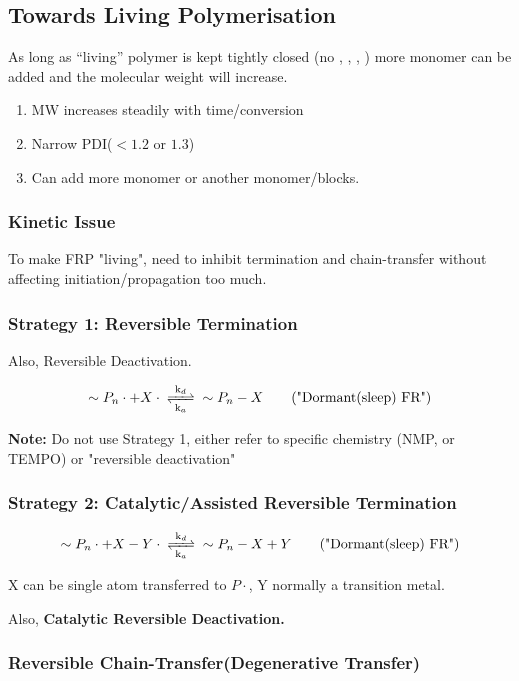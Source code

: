 \documentclass{NoteThesis/note-thesis}
\begin{document}
\subsection{Towards Living Polymerisation}

As long as “living” polymer is kept tightly closed (no , , , ) more monomer can be added and the molecular weight will increase.

\begin{enumerate}
    \item MW increases steadily with time/conversion
    \item Narrow PDI($<1.2$ or $1.3$)
    \item Can add more monomer or another monomer/blocks.
\end{enumerate}

\subsubsection*{Kinetic Issue}

To make FRP "living", need to inhibit termination and chain-transfer without affecting initiation/propagation too much.

\subsubsection*{Strategy 1: Reversible Termination}

Also, Reversible Deactivation.

$$
\sim P_n \cdot + X \cdot \ce{<=>[k_d][k_a]} \sim P_n -X \qquad (\text{"Dormant(sleep) FR"})
$$

\textbf{Note:} Do not use Strategy 1, either refer to specific chemistry (NMP, or TEMPO) or "reversible deactivation"

\subsubsection*{Strategy 2: Catalytic/Assisted Reversible Termination}

$$
\sim P_n \cdot + X-Y \cdot \ce{<=>[k_d][k_a]} \sim P_n -X +Y\qquad (\text{"Dormant(sleep) FR"})
$$

X can be single atom transferred to $P\cdot$, Y normally a transition metal.

Also, \textbf{Catalytic Reversible Deactivation.}

\subsubsection*{Reversible Chain-Transfer(Degenerative Transfer)}
\end{document}
